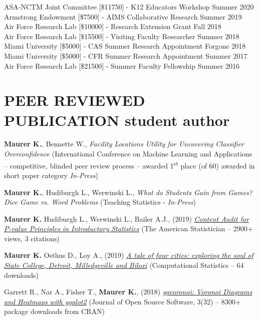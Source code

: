 \documentclass[margin, 10pt]{res}\usepackage[]{graphicx}\usepackage[]{color}
\begin{document}
\begin{resume}
ASA-NCTM Joint Committee [\$11750] - K12 Educators Workshop \hfill Summer 2020 \\
Armstrong Endowment [\$7500] - AIMS Collaborative Research \hfill Summer 2019 \\
Air Force Research Lab [\$10000] - Research Extension Grant \hfill Fall 2018\\
Air Force Research Lab [\$15500] - Visiting Faculty Researcher \hfill Summer 2018 \\
Miami University [\$5000] - CAS Summer Research Appointment  \hfill Forgone 2018 \\
Miami University [\$5000] - CFR Summer Research Appointment  \hfill Summer 2017 \\
Air Force Research Lab [\$21500] - Summer Faculty Fellowship  \hfill Summer 2016

  
\section{PEER REVIEWED PUBLICATION \newline \newline *student author} 

\textbf{Maurer K.}, Bennette W., \textit{Facility Locations Utility for Uncovering Classifier Overconfidence} (International Conference on Machine Learning and Applications -- competitive, blinded peer review process -- awarded 1\textsuperscript{st} place (of 60) awarded in short paper category {\it In-Press})

\textbf{Maurer K.}, Hudiburgh L., Werwinski L., \textit{What do Students Gain from Games? Dice Game vs. Word Problems} (Teaching Statistics - {\it In-Press})

\textbf{Maurer K.} Hudiburgh L., Werwinski L., Bailer A.J., (2019) \href{https://www.tandfonline.com/doi/pdf/10.1080/00031305.2018.1537890?needAccess=true}{\it Content Audit for P-value Principles in Introductory Statistics} (The American Statistician -- 2900+ views, 3 citations)
  
\textbf{Maurer K.} Osthus D., Loy A., (2019) \href{https://rdcu.be/bgbJV}{\it A tale of four cities: exploring the soul of State College, Detroit, Milledgeville and Biloxi} (Computational Statistics -- 64 downloads) 

Garrett R.{\bf *}, Nar A.{\bf *}, Fisher T., \textbf{Maurer K.}, (2018) \href{https://www.theoj.org/joss-papers/joss.01096/10.21105.joss.01096.pdf}{\it ggvoronoi: Voronoi Diagrams and Heatmaps with ggplot2} (Journal of Open Source Software, 3(32) -- 8300+ package downloads from CRAN) 


\end{resume}
\end{document}
